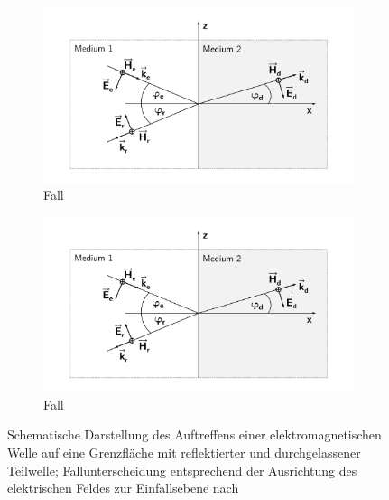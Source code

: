 \begin{figure}[ht]
    \centering
    \begin{subfigure}[b]{0.45\textwidth}
        \includegraphics[page = 1, width=\textwidth, trim = 3.5cm 1cm 3.5cm 1cm, clip]{Abbildungen/Kapitel2/Wellenreflektion.pdf}
        \caption{Fall \label{subfig:2_Wellenreflektion_Fall1}}
    \end{subfigure}
    \hspace{1cm}
    \begin{subfigure}[b]{0.45\textwidth}
        \includegraphics[page = 2, width=\textwidth, trim = 3.5cm 1cm 3.5cm 1cm, clip]{Abbildungen/Kapitel2/Wellenreflektion.pdf}
        \caption{Fall \label{subfig:2_Wellenreflektion_Fall2}}
    \end{subfigure}
    \caption[Schematische Darstellung des Auftreffens einer elektromagnetischen Welle auf eine Grenzfläche mit reflektierter und durchgelassener Teilwelle]{Schematische Darstellung des Auftreffens einer elektromagnetischen Welle auf eine Grenzfläche mit reflektierter und durchgelassener Teilwelle; Fallunterscheidung entsprechend der Ausrichtung des elektrischen Feldes zur Einfallsebene nach~\cite{EM_Schirmung}}
    \label{fig:2_Wellenreflektion}
\end{figure}

